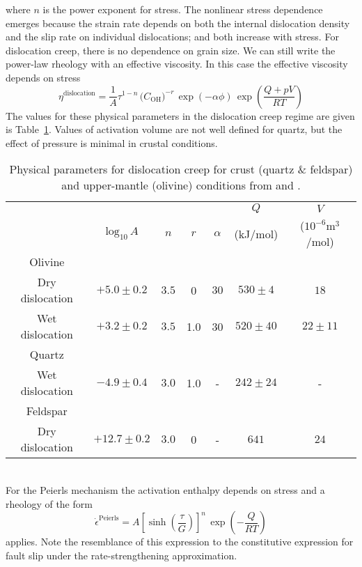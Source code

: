 \documentclass[letterpaper,12pt,]{memoir}
\begin{document}
where $n$ is the power exponent for stress. The nonlinear stress dependence emerges because the strain rate depends on both the internal dislocation density and the slip rate on individual dislocations; and both increase with stress. For dislocation creep, there is no dependence on grain size. We can still write the power-law rheology with an effective viscosity. In this case the effective viscosity depends on stress
\begin{equation}
\eta^\text{dislocation}=\frac{1}{A}\tau^{1-n}\,\big(C_\text{OH}\big)^{-r}\,\exp\left(-\alpha\phi\right)\,\exp\left(\frac{Q+pV}{RT}\right)
\end{equation}
The values for these physical parameters in the dislocation creep regime are given is Table~\ref{tbl:powerlaw-viscosity}. Values of activation volume are not well defined for quartz, but the effect of pressure is minimal in crustal conditions.\\
%
\begin{table}[t]
\centering
{}
\def\arraystretch{1.5}
\begin{tabular*}{0.98\columnwidth}{ccccccc}
 &        &        &       &                & $Q$ & $V$ \\
 & $\text{log}_{10}\,A$ & $n$ & $r$ & $\alpha$ & (kJ/mol) & ($10^{-6}$m$^3$/mol) \\
\hline
Olivine \\
Dry dislocation & $+5.0\pm0.2$ & $3.5$  & 0 & $30$ & $530\pm4$ & $18$ \\
Wet dislocation & $+3.2\pm0.2$ & $3.5$ & 1.0 & 30 & $520\pm40$ & $22\pm11$ \\
Quartz \\
Wet dislocation & $-4.9\pm0.4$ & $3.0$ & 1.0 & - & $242\pm24$ & - \\
Feldspar \\
Dry dislocation & $+12.7\pm0.2$ & $3.0$ & 0 & - & $641$ & $24$
\end{tabular*}
\vspace{0.1cm}
\caption{Physical parameters for dislocation creep for crust (quartz \& feldspar) and upper-mantle (olivine) conditions 	from \cite{hirth&kohlstedt03} and \cite{burgmann&dresen08}.}
\label{tbl:powerlaw-viscosity}
\end{table}
%
\\
For the Peierls mechanism the activation enthalpy depends on stress and a rheology of the form
\begin{equation}
\dot{\epsilon}^\text{Peierls}=A\left[\sinh\left(\frac{\tau}{G}\right)\right]^n\,\exp\left(-\frac{Q}{RT}\right)
\end{equation}
applies. Note the resemblance of this expression to the constitutive expression for fault slip under the rate-strengthening approximation.
\end{document}

